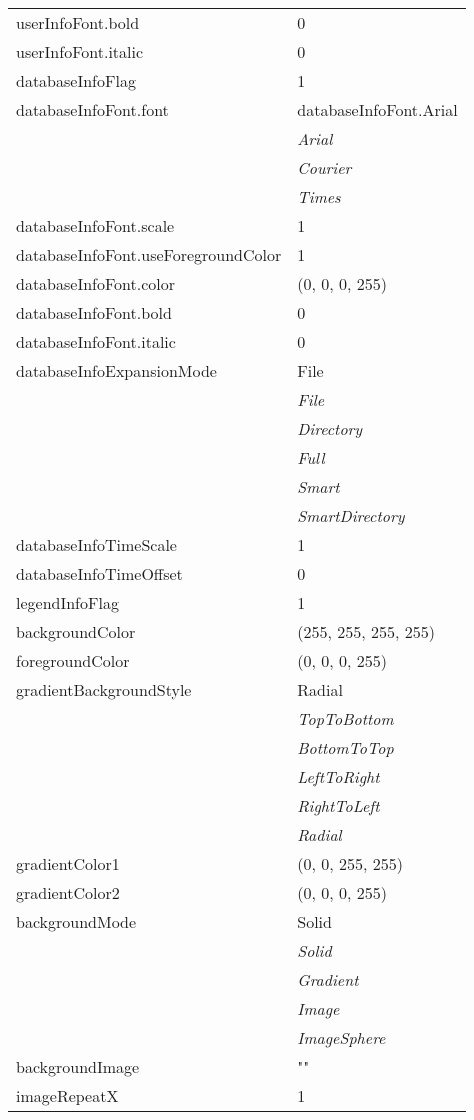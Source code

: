 \documentclass[10pt,a4paper]{report}
\begin{document}
\begin{longtable}{ll}
userInfoFont.bold  &  0 \\
userInfoFont.italic  &  0 \\
databaseInfoFlag  &  1 \\
databaseInfoFont.font  &  databaseInfoFont.Arial   \\
 & {\it  Arial} \\
 & {\it  Courier} \\
 & {\it  Times} \\
databaseInfoFont.scale  &  1 \\
databaseInfoFont.useForegroundColor  &  1 \\
databaseInfoFont.color  &  (0, 0, 0, 255) \\
databaseInfoFont.bold  &  0 \\
databaseInfoFont.italic  &  0 \\
databaseInfoExpansionMode  &  File   \\
 & {\it  File} \\
 & {\it  Directory} \\
 & {\it  Full} \\
 & {\it  Smart} \\
 & {\it  SmartDirectory} \\
databaseInfoTimeScale  &  1 \\
databaseInfoTimeOffset  &  0 \\
legendInfoFlag  &  1 \\
backgroundColor  &  (255, 255, 255, 255) \\
foregroundColor  &  (0, 0, 0, 255) \\
gradientBackgroundStyle  &  Radial   \\
 & {\it  TopToBottom} \\
 & {\it  BottomToTop} \\
 & {\it  LeftToRight} \\
 & {\it  RightToLeft} \\
 & {\it  Radial} \\
gradientColor1  &  (0, 0, 255, 255) \\
gradientColor2  &  (0, 0, 0, 255) \\
backgroundMode  &  Solid   \\
 & {\it  Solid} \\
 & {\it  Gradient} \\
 & {\it  Image} \\
 & {\it  ImageSphere} \\
backgroundImage  &  "" \\
imageRepeatX  &  1 \\

\end{longtable}
\end{document}

